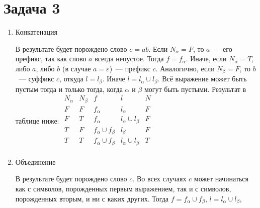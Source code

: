 \documentclass[a4paper]{article}
\begin{document}
\section*{Задача 3}
\begin{enumerate}
\item{Конкатенация}\newline
{}
\newline
В результате будет порождено слово $c=ab$.\newline
Если $N_\alpha=F$, то $a$~--- его префикс, так как слово $a$ всегда непустое. Тогда $f=f_\alpha$. Иначе, если $N_\alpha=T$, либо $a$, либо $b$ (в случае $a=\varepsilon$)~--- префикс $c$. Аналогично, если $N_\beta=F$, то $b$~--- суффикс $c$, откуда $l=l_\beta$. Иначе $l=l_\alpha\cup l_\beta$.\newline
Всё выражение может быть пустым тогда и только тогда, когда $\alpha$ и $\beta$ могут быть пустыми. Результат в таблице ниже:\newline
$
\begin{array}{ccccc}
N_\alpha & N_\beta & f & l & N\\
F & F & f_\alpha & l_\alpha & F \\
F & T & f_\alpha & l_\alpha \cup l_\beta & F\\
T & F & f_\alpha \cup f_\beta & l_\beta & F\\
T & T & f_\alpha \cup f_\beta & l_\alpha \cup l_\beta & T\\
\end{array}
$
\item{Объединение}\newline
{}
\newline
В результате будет порождено слово $c$.\newline
Во всех случаях $c$ может начинаться как с символов, порожденных первым выражением, так и с символов, порожденных вторым, и ни с каких других. Тогда $f=f_\alpha\cup f_\beta$, $l=l_\alpha\cup l_\beta$,

\end{enumerate}
\end{document}
